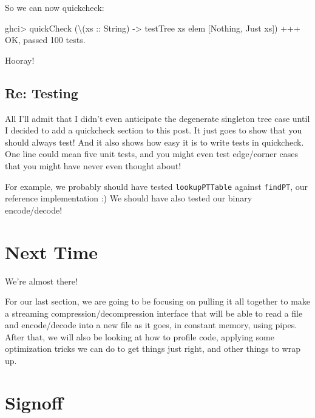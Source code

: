 \documentclass[]{article}
\newenvironment{Shaded}{}{}
\newcommand{\DataTypeTok}[1]{\textcolor[rgb]{0.56,0.13,0.00}{#1}}
\newcommand{\DecValTok}[1]{\textcolor[rgb]{0.25,0.63,0.44}{#1}}
\newcommand{\NormalTok}[1]{#1}
\newcommand{\OperatorTok}[1]{\textcolor[rgb]{0.40,0.40,0.40}{#1}}
\newcommand{\OtherTok}[1]{\textcolor[rgb]{0.00,0.44,0.13}{#1}}
\begin{document}
So we can now quickcheck:

\begin{Shaded}
\begin{Highlighting}[]
\NormalTok{ghci}\OperatorTok{>}\NormalTok{ quickCheck (\textbackslash{}(}\OtherTok{xs ::} \DataTypeTok{String}\NormalTok{) }\OtherTok{{-}>}\NormalTok{ testTree\textquotesingle{} xs }\OtherTok{\textasciigrave{}elem\textasciigrave{}}\NormalTok{ [}\DataTypeTok{Nothing}\NormalTok{, }\DataTypeTok{Just}\NormalTok{ xs])}
\OperatorTok{+++} \DataTypeTok{OK}\NormalTok{, passed }\DecValTok{100}\NormalTok{ tests}\OperatorTok{.}
\end{Highlighting}
\end{Shaded}

Hooray!

\hypertarget{re-testing}{%
\subsection{Re: Testing}\label{re-testing}}

All I'll admit that I didn't even anticipate the degenerate singleton tree case
until I decided to add a quickcheck section to this post. It just goes to show
that you should always test! And it also shows how easy it is to write tests in
quickcheck. One line could mean five unit tests, and you might even test
edge/corner cases that you might have never even thought about!

For example, we probably should have tested \texttt{lookupPTTable} against
\texttt{findPT}, our reference implementation :) We should have also tested our
binary encode/decode!

\hypertarget{next-time}{%
\section{Next Time}\label{next-time}}

We're almost there!

For our last section, we are going to be focusing on pulling it all together to
make a streaming compression/decompression interface that will be able to read a
file and encode/decode into a new file as it goes, in constant memory, using
pipes. After that, we will also be looking at how to profile code, applying some
optimization tricks we can do to get things just right, and other things to wrap
up.

\hypertarget{signoff}{%
\section{Signoff}\label{signoff}}
\end{document}
